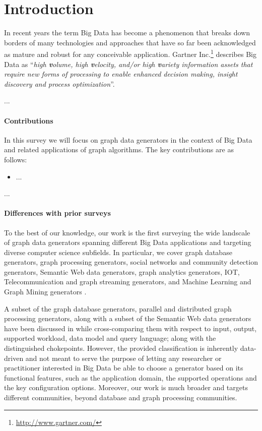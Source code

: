 \section{Introduction}
\label{sec:intro}

In recent years the term Big Data has become a phenomenon that breaks down borders of many technologies and approaches that have so far been acknowledged as mature and robust for any conceivable application. Gartner Inc.\footnote{\url{http://www.gartner.com/}} describes Big Data as ``\emph{high \textbf{v}olume, high \textbf{v}elocity, and/or high \textbf{v}ariety information assets that require new forms of processing to enable enhanced decision making, insight discovery and process optimization}''.

...


\paragraph*{Contributions} In this survey we will focus on graph data generators in the context of Big Data and related applications of graph algorithms. The key contributions are as follows:
\begin{itemize}
  \item ...
\end{itemize}

...

\paragraph*{Differences with prior surveys}

To the best of our knowledge, our work is the first surveying the wide
landscale of graph data generators spanning different Big Data applications and 
targeting diverse computer science subfields. In particular, we cover graph database
generators, graph processing generators, social networks and community detection
generators, Semantic Web data generators, graph
analytics generators, IOT, Telecommunication and graph streaming generators, 
and Machine Learning and Graph Mining generators . 

A subset of the graph database
generators, parallel and distributed graph processing generators, along
with a subset of the Semantic Web data generators have been discussed in
\cite{BFHI18} while cross-comparing them with respect to input, output,
supported workload, data model and query language; along with the
distinguished chokepoints. However, the provided classification is
inherently data-driven and not meant to serve the purpose of letting any
researcher or practitioner interested in Big Data be able to choose a
generator based on its functional features, such as the application domain,
the supported operations and the key configuration options. 
Moreover, our work is much broader and targets different communities, beyond database
and graph processing communities. 

